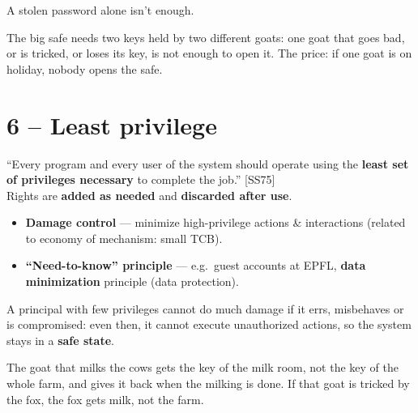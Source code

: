 \begin{exbox}[title=2AF]
A stolen password alone isn't enough.
\end{exbox}

\begin{goatbox}
The big safe needs two keys held by two different goats: one goat that goes bad, or is tricked,
or loses its key, is not enough to open it. The price: if one goat is on holiday, nobody opens
the safe.
\end{goatbox}

\section{6 -- Least privilege}

\begin{defnbox}[title=Least privilege]
``Every program and every user of the system should operate using the \textbf{least set
of privileges necessary} to complete the job.'' [SS75] \\
Rights are \textbf{added as needed} and \textbf{discarded after use}.
\end{defnbox}

\begin{propbox}[title=Least privilege in practice]
\begin{itemize}
  \item \textbf{Damage control} --- minimize high-privilege actions \& interactions
        (related to economy of mechanism: small TCB).
  \item \textbf{``Need-to-know'' principle} --- e.g.\ guest accounts at EPFL,
        \textbf{data minimization} principle (data protection).
\end{itemize}
\end{propbox}

\begin{rembox}[title={Which principle is it related to? Fail-safe defaults}]
A principal with few privileges cannot do much damage if it errs, misbehaves or is compromised:
even then, it cannot execute unauthorized actions, so the system stays in a \textbf{safe state}.
\end{rembox}

\begin{goatbox}
The goat that milks the cows gets the key of the milk room, not the key of the whole farm, and
gives it back when the milking is done. If that goat is tricked by the fox, the fox gets milk,
not the farm.
\end{goatbox}

